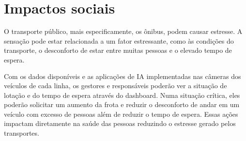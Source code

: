 \section{Impactos sociais}
\indent
\par O transporte público, mais especificamente, os ônibus, podem causar estresse. A sensação pode estar relacionada a um fator estressante, como às condições do transporte, o desconforto de estar entre muitas pessoas e o elevado tempo de espera.
\par Com os dados disponíveis e as aplicações de IA implementadas nas câmeras dos veículos de cada linha, os gestores e responsáveis poderão ver a situação de lotação e do tempo de espera através do dashboard. Numa situação crítica, eles poderão solicitar um aumento da frota e reduzir o desconforto de andar em um veículo com excesso de pessoas além de reduzir o tempo de espera. Essas ações impactam diretamente na saúde das pessoas reduzindo o estresse gerado pelos transportes.